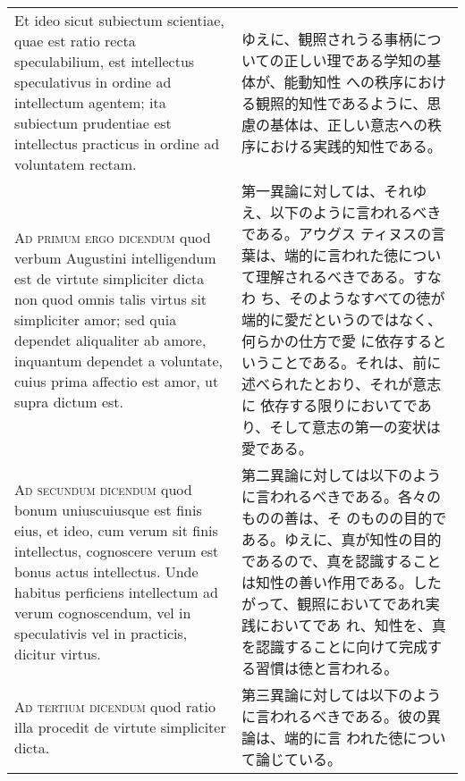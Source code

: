 \documentclass[10pt]{jsarticle}
\begin{document}
\begin{longtable}{p{21em}p{21em}}
\\

Et ideo sicut subiectum scientiae, quae est ratio recta speculabilium,
est intellectus speculativus in ordine ad intellectum agentem; ita
subiectum prudentiae est intellectus practicus in ordine ad voluntatem
rectam.

&

ゆえに、観照されうる事柄についての正しい理である学知の基体が、能動知性
への秩序における観照的知性であるように、思慮の基体は、正しい意志への秩
序における実践的知性である。

\\

{\scshape Ad primum ergo dicendum} quod verbum Augustini intelligendum
est de virtute simpliciter dicta non quod omnis talis virtus sit
simpliciter amor; sed quia dependet aliqualiter ab amore, inquantum
dependet a voluntate, cuius prima affectio est amor, ut supra dictum
est.

&

第一異論に対しては、それゆえ、以下のように言われるべきである。アウグス
ティヌスの言葉は、端的に言われた徳について理解されるべきである。すなわ
ち、そのようなすべての徳が端的に愛だというのではなく、何らかの仕方で愛
に依存するということである。それは、前に述べられたとおり、それが意志に
依存する限りにおいてであり、そして意志の第一の変状は愛である。

\\

{\scshape Ad secundum dicendum} quod bonum uniuscuiusque est finis
eius, et ideo, cum verum sit finis intellectus, cognoscere verum est
bonus actus intellectus. Unde habitus perficiens intellectum ad verum
cognoscendum, vel in speculativis vel in practicis, dicitur virtus.

&

第二異論に対しては以下のように言われるべきである。各々のものの善は、そ
のものの目的である。ゆえに、真が知性の目的であるので、真を認識すること
は知性の善い作用である。したがって、観照においてであれ実践においてであ
れ、知性を、真を認識することに向けて完成する習慣は徳と言われる。

\\

{\scshape Ad tertium dicendum} quod ratio illa procedit de virtute
simpliciter dicta.

&

第三異論に対しては以下のように言われるべきである。彼の異論は、端的に言
われた徳について論じている。

\end{longtable}
\newpage
\end{document}
